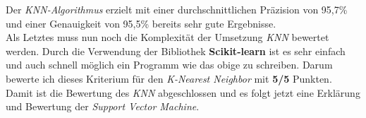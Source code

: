Der \textit{KNN-Algorithmus} erzielt mit einer durchschnittlichen Präzision von 95,7\% und einer Genauigkeit von 95,5\% bereits sehr gute Ergebnisse.\\\hfill
Als Letztes muss nun noch die Komplexität der Umsetzung \textit{KNN} bewertet werden. Durch die Verwendung der Bibliothek \textbf{Scikit-learn} ist es sehr einfach und auch schnell möglich ein Programm wie das obige zu schreiben. Darum bewerte ich dieses Kriterium für den \textit{K-Nearest Neighbor} mit \textbf{5/5} Punkten.\\\hfill
Damit ist die Bewertung des \textit{KNN} abgeschlossen und es folgt jetzt eine Erklärung und Bewertung der \textit{Support Vector Machine}.
\newpage
